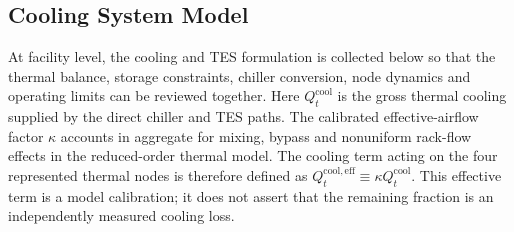 \subsection{Cooling System Model}\label{sec:cooling-model}

At facility level, the cooling and TES formulation is collected below so that
the thermal balance, storage constraints, chiller conversion, node dynamics and
operating limits can be reviewed together.
Here $Q_t^{\mathrm{cool}}$ is the gross thermal cooling supplied by the direct
chiller and TES paths. The calibrated effective-airflow factor $\kappa$ accounts
in aggregate for mixing, bypass and nonuniform rack-flow effects in the
reduced-order thermal model. The cooling term acting on the four represented
thermal nodes is therefore defined as
$Q_t^{\mathrm{cool,eff}}\equiv\kappa Q_t^{\mathrm{cool}}$. This effective term
is a model calibration; it does not assert that the remaining fraction is an
independently measured cooling loss.

